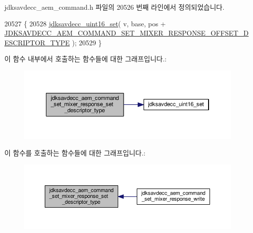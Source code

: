 jdksavdecc\+\_\+aem\+\_\+command.\+h 파일의 20526 번째 라인에서 정의되었습니다.


\begin{DoxyCode}
20527 \{
20528     \hyperlink{group__endian_ga14b9eeadc05f94334096c127c955a60b}{jdksavdecc\_uint16\_set}( v, base, pos + 
      \hyperlink{group__command__set__mixer__response_ga2a1ce9786da431666e786485a051c4c3}{JDKSAVDECC\_AEM\_COMMAND\_SET\_MIXER\_RESPONSE\_OFFSET\_DESCRIPTOR\_TYPE}
       );
20529 \}
\end{DoxyCode}


이 함수 내부에서 호출하는 함수들에 대한 그래프입니다.\+:
\nopagebreak
\begin{figure}[H]
\begin{center}
\leavevmode
\includegraphics[width=350pt]{group__command__set__mixer__response_gaab927dbb453e210294aa890cd982992b_cgraph}
\end{center}
\end{figure}




이 함수를 호출하는 함수들에 대한 그래프입니다.\+:
\nopagebreak
\begin{figure}[H]
\begin{center}
\leavevmode
\includegraphics[width=350pt]{group__command__set__mixer__response_gaab927dbb453e210294aa890cd982992b_icgraph}
\end{center}
\end{figure}


